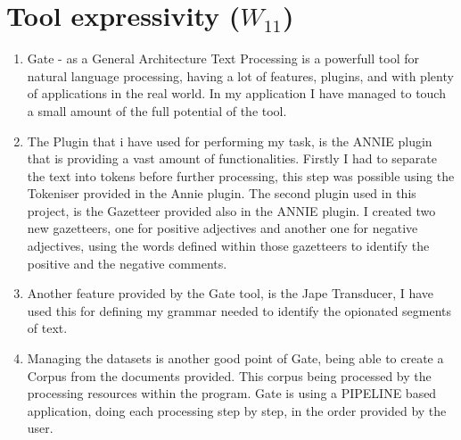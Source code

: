 \documentclass[a4paper,12pt]{report}
\begin{document}
\begin{comment}
\paragraph{The not-organised student.}
You are not organised, if something like this will happen to you:
\begin{itemize}
 \item You do not find your project and yield "Someone removed my project!". 
Most of the time your are logged with a different user as usual. 
Check this with \texttt{who am i}. 
This is not a rhetorical question, but a Linux command.
\item You are working in a different directory. 
Type \texttt{pwd} and \texttt{ls} to check that your executables are indeed in the current working directory.
If you have been lasy to set your PATH variable, you might just forgot to type \texttt{./} 
for executing the command in the current directory.
\end{itemize}

\end{comment}

\chapter{Tool expressivity ($W_{11}$)}


\begin{enumerate}
 \item Gate - as a General Architecture Text Processing is a powerfull tool for natural language processing, having a lot of features, plugins, and with plenty of applications in the real world. In my application I have managed to touch a small amount of the full potential of the tool.
 \item The Plugin that i have used for performing my task, is the ANNIE plugin that is providing a vast amount of functionalities. Firstly I had to separate the text into tokens before further processing, this step was possible using the Tokeniser provided in the Annie plugin. The second plugin used in this project, is the Gazetteer
 provided also in the ANNIE plugin. I created two new gazetteers, one for positive adjectives and another one for negative adjectives, using the words defined within those gazetteers to identify the positive and the negative comments.
 \item Another feature provided by the Gate tool, is the Jape Transducer, I have used this for defining my grammar needed to identify the opionated segments of text.
 \item Managing the datasets is another good point of Gate, being able to create a Corpus from the documents provided. This corpus being processed by the processing resources within the program. Gate is using a PIPELINE based application, doing each processing step by step, in the order provided by the user.
\end{enumerate}
\end{document}
